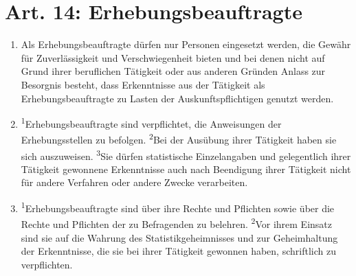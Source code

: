     \section{Art. 14: Erhebungsbeauftragte}
        \begin{enumerate}[label=(\arabic*)]
            \item Als Erhebungsbeauftragte dürfen nur Personen eingesetzt werden, die Gewähr für Zuverlässigkeit und Verschwiegenheit bieten und bei denen nicht auf Grund ihrer beruflichen Tätigkeit oder aus anderen Gründen Anlass zur Besorgnis besteht, dass Erkenntnisse aus der Tätigkeit als Erhebungsbeauftragte zu Lasten der Auskunftspflichtigen genutzt werden.
            \item \textsuperscript{1}Erhebungsbeauftragte sind verpflichtet, die Anweisungen der Erhebungsstellen zu befolgen. \textsuperscript{2}Bei der Ausübung ihrer Tätigkeit haben sie sich auszuweisen. \textsuperscript{3}Sie dürfen statistische Einzelangaben und gelegentlich ihrer Tätigkeit gewonnene Erkenntnisse auch nach Beendigung ihrer Tätigkeit nicht für andere Verfahren oder andere Zwecke verarbeiten.
            \item \textsuperscript{1}Erhebungsbeauftragte sind über ihre Rechte und Pflichten sowie über die Rechte und Pflichten der zu Befragenden zu belehren. \textsuperscript{2}Vor ihrem Einsatz sind sie auf die Wahrung des Statistikgeheimnisses und zur Geheimhaltung der Erkenntnisse, die sie bei ihrer Tätigkeit gewonnen haben, schriftlich zu verpflichten.
        \end{enumerate}
